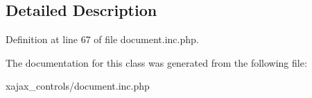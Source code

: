 \subsection{Detailed Description}


Definition at line 67 of file document.inc.php.



The documentation for this class was generated from the following file:\begin{DoxyCompactItemize}
\item 
xajax\_\-controls/document.inc.php\end{DoxyCompactItemize}
